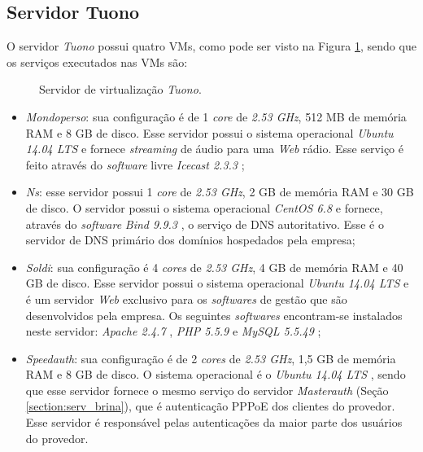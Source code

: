 \subsection{Servidor Tuono}
\label{section:serv_tuono}

O servidor \textit{Tuono} possui quatro \acp{VM}, como pode ser visto na Figura \ref{fig:servidor_tuono}, sendo que os serviços executados nas 
\acp{VM} são:

\begin{figure}[h!]
 \centering
 \caption{Servidor de virtualização \textit{Tuono}.}
 \label{fig:servidor_tuono}
\end{figure}

\begin{itemize}
 \item \textit{Mondoperso}: sua configuração é de 1 \textit{core} de \textit{2.53 GHz}, 512 MB de memória \ac{RAM} e 8 GB de disco. 
 Esse servidor possui o sistema operacional \textit{Ubuntu 14.04 \ac{LTS}} \cite{ubuntu} e fornece \textit{streaming} de áudio para uma 
 \textit{Web} rádio. Esse serviço é feito através do \textit{software} livre \textit{Icecast 2.3.3} \cite{icecast};
 
 \item \textit{Ns}: esse servidor possui 1 \textit{core} de \textit{2.53 GHz}, 2 GB de memória \ac{RAM} e 30 GB de disco. O servidor possui o 
 sistema operacional \textit{CentOS 6.8} \cite{centos} e fornece, através do \textit{software} \textit{Bind 9.9.3} \cite{bind}, o serviço de 
 \ac{DNS} autoritativo. Esse é o servidor de \ac{DNS} primário dos domínios hospedados pela empresa;

 \item \textit{Soldi}: sua configuração é 4 \textit{cores} de \textit{2.53 GHz}, 4 GB de memória \ac{RAM} e 40 GB de disco. 
 Esse servidor possui o sistema operacional \textit{Ubuntu 14.04 \ac{LTS}} \cite{ubuntu} e é um servidor \textit{Web} exclusivo para os
 \textit{softwares} de gestão que são desenvolvidos pela empresa. Os seguintes \textit{softwares} encontram-se instalados neste servidor: 
 \textit{Apache 2.4.7} \cite{apache}, \textit{\ac{PHP} 5.5.9} \cite{php} e \textit{MySQL 5.5.49} \cite{mysql};

 \item \textit{Speedauth}: sua configuração é de 2 \textit{cores} de \textit{2.53 GHz}, 1,5 GB de memória \ac{RAM} e 8 GB de disco. 
 O sistema operacional é o \textit{Ubuntu 14.04 \ac{LTS}} \cite{ubuntu}, sendo que esse servidor fornece o mesmo serviço do servidor 
 \textit{Masterauth} (Seção \ref{section:serv_brina}), que é autenticação \ac{PPPoE} dos clientes do provedor. Esse servidor é responsável pelas 
 autenticações da maior parte dos usuários do provedor.
\end{itemize}

